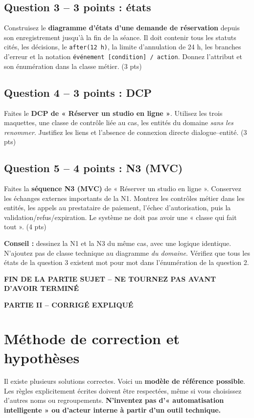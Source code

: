 \documentclass[10pt,a4paper]{article}
\begin{document}
\subsection*{Question 3 -- 3 points : états}
Construisez le \textbf{diagramme d'états d'une demande de réservation} depuis son enregistrement jusqu'à la fin de la séance. Il doit contenir tous les statuts cités, les décisions, le \texttt{after(12 h)}, la limite d'annulation de 24 h, les branches d'erreur et la notation \texttt{événement [condition] / action}. Donnez l'attribut et son énumération dans la classe métier. (3 pts)
\subsection*{Question 4 -- 3 points : DCP}
Faites le \textbf{DCP de « Réserver un studio en ligne »}. Utilisez les trois maquettes, une classe de contrôle liée au cas, les entités du domaine \emph{sans les renommer}. Justifiez les liens et l'absence de connexion directe dialogue--entité. (3 pts)
\subsection*{Question 5 -- 4 points : N3 (MVC)}
Faites la \textbf{séquence N3 (MVC)} de « Réserver un studio en ligne ». Conservez les échanges externes importants de la N1. Montrez les contrôles métier dans les entités, les appels au prestataire de paiement, l'échec d'autorisation, puis la validation/refus/expiration. Le système ne doit pas avoir une « classe qui fait tout ». (4 pts)
\begin{warningbox}
\textbf{Conseil :} dessinez la N1 et la N3 du même cas, avec une logique identique. N'ajoutez pas de classe technique au diagramme \emph{du domaine}. Vérifiez que tous les états de la question 3 existent mot pour mot dans l'énumération de la question 2.
\end{warningbox}
\vfill
\begin{center}\textbf{FIN DE LA PARTIE SUJET -- NE TOURNEZ PAS AVANT D'AVOIR TERMINÉ}\end{center}
\clearpage
\begin{center}{\Large\bfseries\color{teal} PARTIE II -- CORRIGÉ EXPLIQUÉ}\end{center}
\section{Méthode de correction et hypothèses}
Il existe plusieurs solutions correctes. Voici un \textbf{modèle de référence possible}. Les règles explicitement écrites doivent être respectées, même si vous choisissez d'autres noms ou regroupements. \textbf{N'inventez pas d'« automatisation intelligente » ou d'acteur interne à partir d'un outil technique.}
\end{document}
